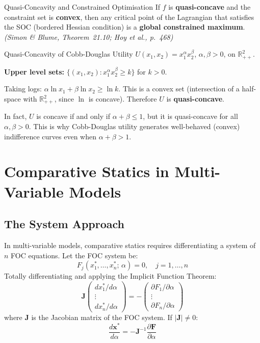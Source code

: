 \documentclass[12pt, a4paper]{article}
\theoremstyle{definition}
\newcommand{\R}{\mathbb{R}}
\newcommand{\bx}{\mathbf{x}}
\newcommand{\bJ}{\mathbf{J}}
\newcommand{\ddd}[2]{\dfrac{d#1}{d#2}}
\begin{document}
\begin{thmbox}{Quasi-Concavity and Constrained Optimisation}
If $f$ is \textbf{quasi-concave} and the constraint set is \textbf{convex},
then any critical point of the Lagrangian that satisfies the SOC (bordered
Hessian condition) is a \textbf{global constrained maximum}.
\emph{(Simon \& Blume, Theorem~21.10; Hoy et al., p.\ 468)}
\end{thmbox}
\newpage
\begin{exbox}{Quasi-Concavity of Cobb-Douglas Utility}
$U(x_1,x_2) = x_1^\alpha x_2^\beta$, $\alpha, \beta > 0$, on $\R^2_{++}$.

\textbf{Upper level sets:}
$\{(x_1,x_2) : x_1^\alpha x_2^\beta \geq k\}$ for $k > 0$.

Taking logs: $\alpha\ln x_1 + \beta\ln x_2 \geq \ln k$.
This is a convex set (intersection of a half-space with $\R^2_{++}$,
since $\ln$ is concave). Therefore $U$ is \textbf{quasi-concave}.

In fact, $U$ is concave if and only if $\alpha+\beta \leq 1$, but it is
quasi-concave for all $\alpha, \beta > 0$. This is why Cobb-Douglas utility
generates well-behaved (convex) indifference curves even when
$\alpha+\beta > 1$.
\end{exbox}

\section{Comparative Statics in Multi-Variable Models}

\subsection{The System Approach}

In multi-variable models, comparative statics requires differentiating a
system of $n$ FOC equations. Let the FOC system be:
\[
  F_j(x_1^*, \ldots, x_n^*;\, \alpha) = 0, \quad j = 1, \ldots, n
\]
Totally differentiating and applying the Implicit Function Theorem:
\[
  \bJ \begin{pmatrix}dx_1^*/d\alpha \\ \vdots \\ dx_n^*/d\alpha\end{pmatrix}
  = -\begin{pmatrix}\partial F_1/\partial\alpha \\ \vdots \\ \partial F_n/\partial\alpha\end{pmatrix}
\]
where $\bJ$ is the Jacobian matrix of the FOC system. If $|\bJ| \neq 0$:
\[
  \ddd{\bx^*}{\alpha} = -\bJ^{-1}\frac{\partial \mathbf{F}}{\partial\alpha}
\]
\end{document}
